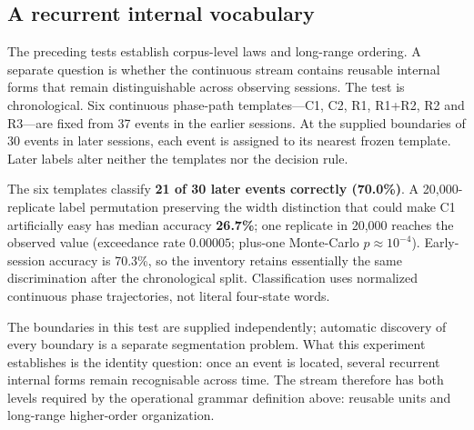 \documentclass[11pt,a4paper]{article}
\newcommand{\bnum}[1]{\textbf{#1}}
\begin{document}
\subsection{A recurrent internal vocabulary}
\label{sec:recurrentforms}

The preceding tests establish corpus-level laws and long-range ordering. A separate
question is whether the continuous stream contains reusable internal forms that remain
distinguishable across observing sessions. The test is chronological. Six continuous
phase-path templates---C1, C2, R1, R1+R2, R2 and R3---are fixed from 37 events in the
earlier sessions. At the supplied boundaries of 30 events in later sessions, each event
is assigned to its nearest frozen template. Later labels alter neither the templates nor
the decision rule.

The six templates classify \bnum{21 of 30 later events correctly (70.0\%)}. A
20{,}000-replicate label permutation preserving the width distinction that could make
C1 artificially easy has median accuracy \bnum{26.7\%}; one replicate in 20{,}000
reaches the observed value (exceedance rate $\mathbf{0.00005}$; plus-one Monte-Carlo
$p \approx 10^{-4}$). Early-session accuracy is 70.3\%,
so the inventory retains essentially the same discrimination after the chronological
split. Classification uses normalized continuous phase trajectories, not literal
four-state words.

The boundaries in this test are supplied independently; automatic discovery of every
boundary is a separate segmentation problem. What this experiment establishes is the
identity question: once an event is located, several recurrent internal forms remain
recognisable across time. The stream therefore has both levels required by the
operational grammar definition above: reusable units and long-range higher-order
organization.
\end{document}
